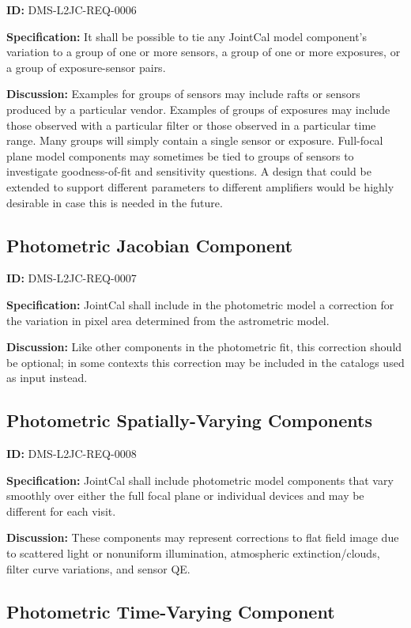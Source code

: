 \documentclass[SE,toc,lsstdraft]{lsstdoc}
\begin{document}
\label{DMS-L2JC-REQ-0006}
\textbf{ID:} DMS-L2JC-REQ-0006

\textbf{Specification:}
It shall be possible to tie any JointCal model component's variation to a group of one or more sensors, a group of one or more exposures, or a group of exposure-sensor pairs.

\textbf{Discussion:}
Examples for groups of sensors may include rafts or sensors produced by a particular vendor.  Examples of groups of exposures may include those observed with a particular filter or those observed in a particular time range.  Many groups will simply contain a single sensor or exposure.  Full-focal plane model components may sometimes be tied to groups of sensors to investigate goodness-of-fit and sensitivity questions.  A design that could be extended to support different parameters to different amplifiers would be highly desirable in case this is needed in the future.

\subsection{Photometric Jacobian Component}

\label{DMS-L2JC-REQ-0007}
\textbf{ID:} DMS-L2JC-REQ-0007

\textbf{Specification:}
JointCal shall include in the photometric model a correction for the variation in pixel area determined from the astrometric model.

\textbf{Discussion:}
Like other components in the photometric fit, this correction should be optional; in some contexts this correction may be included in the catalogs used as input instead.

\subsection{Photometric Spatially-Varying Components}

\label{DMS-L2JC-REQ-0008}
\textbf{ID:} DMS-L2JC-REQ-0008

\textbf{Specification:}
JointCal shall include photometric model components that vary smoothly over either the full focal plane or individual devices and may be different for each visit.

\textbf{Discussion:}
These components may represent corrections to flat field image due to scattered light or nonuniform illumination, atmospheric extinction/clouds, filter curve variations, and sensor QE.

\subsection{Photometric Time-Varying Component}
\end{document}
